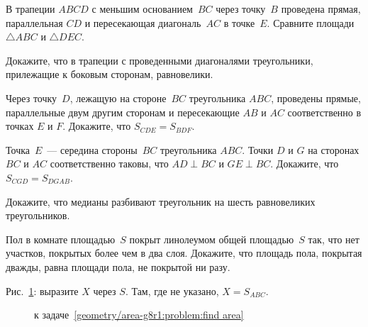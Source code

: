 \begin{problems}

\item
В трапеции $ABCD$ с меньшим основанием~$BC$ через точку~$B$ проведена прямая,
параллельная $CD$ и пересекающая диагональ~$AC$ в точке~$E$.
Сравните площади $\bigtriangleup ABC$ и $\bigtriangleup DEC$.

\item
Докажите, что в трапеции с проведенными диагоналями треугольники, прилежащие
к боковым сторонам, равновелики.


\item
Через точку~$D$, лежащую на стороне~$BC$ треугольника $ABC$, проведены прямые,
параллельные двум другим сторонам и пересекающие $AB$ и $AC$ соответственно
в точках $E$ и $F$.
Докажите, что $S_{CDE} = S_{BDF}$.

\item
Точка~$E$~--- середина стороны~$BC$ треугольника $ABC$.
Точки $D$ и $G$ на сторонах $BC$ и $AC$ соответственно таковы, что
$AD \perp BC$ и $GE \perp BC$.
Докажите, что $S_{CGD} = S_{DGAB}$.

\item
Докажите, что медианы разбивают треугольник на шесть равновеликих
треугольников.

\item
Пол в комнате площадью~$S$ покрыт линолеумом общей площадью~$S$ так, что нет
участков, покрытых более чем в два слоя.
Докажите, что площадь пола, покрытая дважды, равна площади пола, не покрытой
ни разу.

\item
\label{geometry/area-g8r1:problem:find area}%
Рис.~\ref{geometry/area-g8r1:problem:find area:fig}:
выразите $X$ через $S$.
Там, где не указано, $X = S_{ABC}$.

\begin{figure}[ht]
\begin{center}
    \hfill
    \hfill
    \hfill
    \hfill
    \hfill
    \caption{к задаче~\ref{geometry/area-g8r1:problem:find area}}
    \label{geometry/area-g8r1:problem:find area:fig}
\end{center}
\end{figure}


\end{problems}

